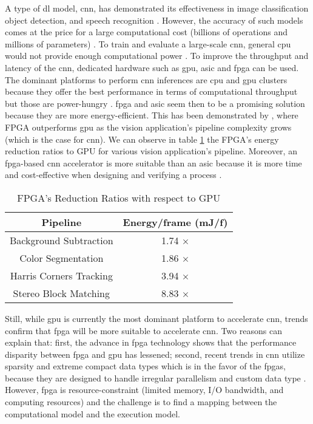 A type of \acrshort{dl} model, \acrfull{cnn}, has demonstrated its effectiveness in image classiﬁcation object detection, and speech recognition \cite{shawahna_fpga-based_2019}. However, the accuracy of such models comes at the price for a large computational cost (billions of operations and millions of parameters) \cite{szegedy_going_2014}. To train and evaluate a large-scale \acrshort{cnn}, general \acrfull{cpu} would not provide enough computational power \cite{liu_fpga-based_2019}. To improve the throughput and latency of the \acrshort{cnn}, dedicated hardware such as \acrfull{gpu}, \acrfull{asic} and \acrfull{fpga} can be used. The dominant platforms to perform \acrshort{cnn} inferences are \acrshort{cpu} and \acrshort{gpu} clusters because they offer the best performance in terms of computational throughput but those are power-hungry \cite{liu_uniform_2019}.
\acrshort{fpga} and \acrshort{asic} seem then to be a promising solution because they are more energy-efficient. This has been demonstrated by \textcite{qasaimeh_comparing_2019}, where FPGA outperforms \acrshort{gpu} as the vision application’s pipeline complexity grows (which is the case for \acrshort{cnn}). We can observe in table \ref{tab:benchener} the FPGA’s energy reduction ratios to GPU for various vision application’s pipeline. Moreover, an \acrshort{fpga}-based \acrshort{cnn} accelerator is more suitable than an \acrshort{asic} because it is more time and cost-effective when designing and verifying a process \cite{motamedi_placid_2017}.
%
\begin{table}
    \center
    \begin{tabular}{|c|c|}
        \hline
        Pipeline & Energy/frame (mJ/f) \\
        \hline
        Background Subtraction & 1.74 $\times$\\
        \hline
        Color Segmentation & 1.86 $\times$ \\
        \hline
        Harris Corners Tracking & 3.94 $\times$ \\
        \hline
        Stereo Block Matching & 8.83 $\times$ \\
        \hline
    \end{tabular}
    \caption{FPGA’s Reduction Ratios with respect to GPU \cite{qasaimeh_comparing_2019}}
    \label{tab:benchener}
\end{table}

Still, while \acrshort{gpu} is currently the most dominant platform to accelerate \acrshort{cnn}, trends confirm that \acrshort{fpga} will be more suitable to accelerate \acrshort{cnn}. Two reasons can explain that: first, the advance in \acrshort{fpga} technology shows that the performance disparity between \acrshort{fpga} and \acrshort{gpu} has lessened; second, recent trends in \acrshort{cnn} utilize sparsity and extreme compact data types which is in the favor of the \acrshort{fpga}s, because they are designed to handle irregular parallelism and custom data type \cite{nurvitadhi_can_2017}. However, \acrshort{fpga} is resource-constraint (limited memory, I/O bandwidth, and computing resources) and the challenge is to find a mapping between the computational model and the execution model.

